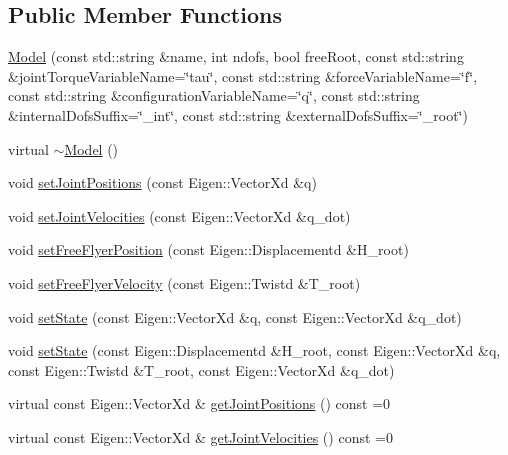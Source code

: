 \subsection*{Public Member Functions}
\begin{DoxyCompactItemize}
\item 
\hyperlink{classocra_1_1Model_a409a72ebb3fb454dc12e6e91d8495715}{Model} (const std\+::string \&name, int ndofs, bool free\+Root, const std\+::string \&joint\+Torque\+Variable\+Name=\char`\"{}tau\char`\"{}, const std\+::string \&force\+Variable\+Name=\char`\"{}f\char`\"{}, const std\+::string \&configuration\+Variable\+Name=\char`\"{}q\char`\"{}, const std\+::string \&internal\+Dofs\+Suffix=\char`\"{}\+\_\+int\char`\"{}, const std\+::string \&external\+Dofs\+Suffix=\char`\"{}\+\_\+root\char`\"{})
\item 
virtual \hyperlink{classocra_1_1Model_acd9ac3268fc9f79738067bc12292521f}{$\sim$\+Model} ()
\item 
void \hyperlink{classocra_1_1Model_a3737cd201f3e70558c7c2ff74da47818}{set\+Joint\+Positions} (const Eigen\+::\+Vector\+Xd \&q)
\item 
void \hyperlink{classocra_1_1Model_ad6b27a212756e49441f7301e748a8dad}{set\+Joint\+Velocities} (const Eigen\+::\+Vector\+Xd \&q\+\_\+dot)
\item 
void \hyperlink{classocra_1_1Model_aaebe8934b2c8f0620e4208f696ea11cf}{set\+Free\+Flyer\+Position} (const Eigen\+::\+Displacementd \&H\+\_\+root)
\item 
void \hyperlink{classocra_1_1Model_a26ce45e1b06e3f1074b4066dbb420865}{set\+Free\+Flyer\+Velocity} (const Eigen\+::\+Twistd \&T\+\_\+root)
\item 
void \hyperlink{classocra_1_1Model_a5ce77dc35046594111df0a3e33ff2aa6}{set\+State} (const Eigen\+::\+Vector\+Xd \&q, const Eigen\+::\+Vector\+Xd \&q\+\_\+dot)
\item 
void \hyperlink{classocra_1_1Model_a6c4feba35aac697c1f18537c8c7c9ce4}{set\+State} (const Eigen\+::\+Displacementd \&H\+\_\+root, const Eigen\+::\+Vector\+Xd \&q, const Eigen\+::\+Twistd \&T\+\_\+root, const Eigen\+::\+Vector\+Xd \&q\+\_\+dot)
\item 
virtual const Eigen\+::\+Vector\+Xd \& \hyperlink{classocra_1_1Model_a9af46a69337d88d28232554175723018}{get\+Joint\+Positions} () const =0
\item 
virtual const Eigen\+::\+Vector\+Xd \& \hyperlink{classocra_1_1Model_a73b9bd94e98138145217526dbe23841a}{get\+Joint\+Velocities} () const =0
\item 

\end{DoxyCompactItemize}
